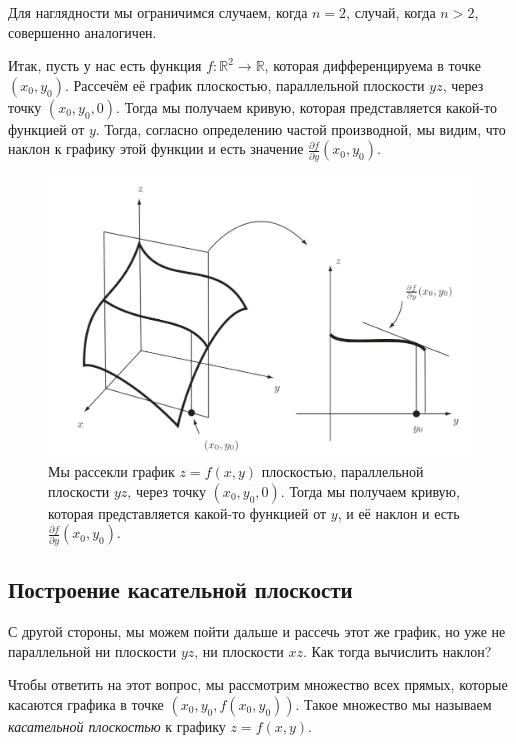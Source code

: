 Для наглядности мы ограничимся случаем, когда $n=2$, случай, когда $n >2$, совершенно аналогичен.

Итак, пусть у нас есть функция $f:\mathbb{R}^2 \to \mathbb{R}$, которая дифференцируема в точке $(x_0,y_0)$. Рассечём её график плоскостью, параллельной плоскости $yz$, через точку $(x_0,y_0,0)$. Тогда мы получаем кривую, которая представляется какой-то функцией от $y$. Тогда, согласно определению частой производной, мы видим, что наклон к графику этой функции и есть значение $\frac{\partial f}{\partial y}(x_0,y_0)$.

\begin{figure}[h!]
    \centering
    \includegraphics[scale = 0.6]{images/partial_deri.jpg}
    \caption{Мы рассекли график $z =f(x,y)$ плоскостью, параллельной плоскости $yz$, через точку $(x_0,y_0,0)$. Тогда мы получаем кривую, которая представляется какой-то функцией от $y$, и её наклон и есть $\frac{\partial f}{\partial y}(x_0,y_0)$.}
    \label{fig:enter-label}
\end{figure}

\subsection{Построение касательной плоскости}

С другой стороны, мы можем пойти дальше и рассечь этот же график, но уже не параллельной ни плоскости $yz$, ни плоскости $xz$. Как тогда вычислить наклон?

Чтобы ответить на этот вопрос, мы рассмотрим множество всех прямых, которые касаются графика в точке $(x_0, y_0, f(x_0,y_0))$. Такое множество мы называем \textit{касательной плоскостью} к графику $z = f(x,y).$

